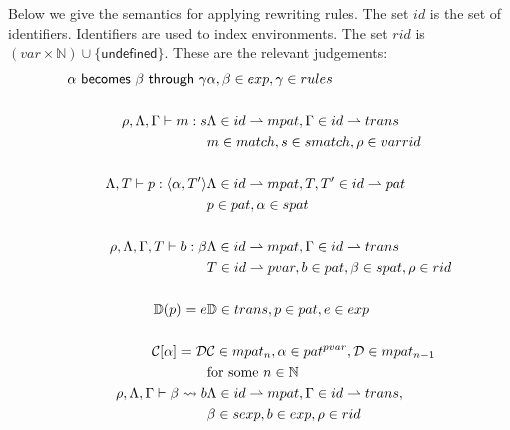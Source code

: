 Below we give the semantics for applying rewriting rules. The set $id$ is the
set of identifiers. Identifiers are used to index environments. The set $rid$ is
$(var \times \mathbb{N}) \cup \{\textsf{undefined}\}$. These are the relevant
judgements:
\begin{eqnarray*}[l@{\quad\quad\quad}l]
  \becomesthrough{\alpha}{\beta}{\gamma} &\alpha, \beta \in exp, \gamma
  \in rules\\
  \\
  \rho, \Lambda, \Gamma |- m : s & \Lambda \in id \rightharpoonup mpat, \Gamma \in id
  \rightharpoonup trans\\
  & m \in match, s \in smatch, \rho \in var rid\\
  \\
  \Lambda, T |- p : \langle \alpha, T' \rangle & \Lambda \in id \rightharpoonup
  mpat, T, T' \in id \rightharpoonup pat\\
  & p \in pat, \alpha \in spat\\
  \\
  \rho, \Lambda, \Gamma, T |- b : \beta & \Lambda \in id \rightharpoonup mpat,
  \Gamma \in id \rightharpoonup trans\\
  & T \in id \rightharpoonup pvar, b \in pat, \beta \in spat, \rho \in rid\\
  \\
  \mathbb{D}(p) = e & \mathbb{D} \in trans, p \in pat, e \in exp\\
  \\
  \mathcal{C}[\alpha] = \mathcal{D} & \mathcal{C} \in mpat_n, \alpha \in
  pat^{pvar}, \mathcal{D} \in mpat_{n - 1}\\
  &\text{for some $n \in
    \mathbb{N}$}\\
  \rho, \Lambda, \Gamma |- \beta \leadsto b & \Lambda \in id \rightharpoonup mpat,
  \Gamma \in id \rightharpoonup trans,\\
  & \beta \in sexp, b \in exp, \rho \in rid\\
  \\
\end{eqnarray*}

